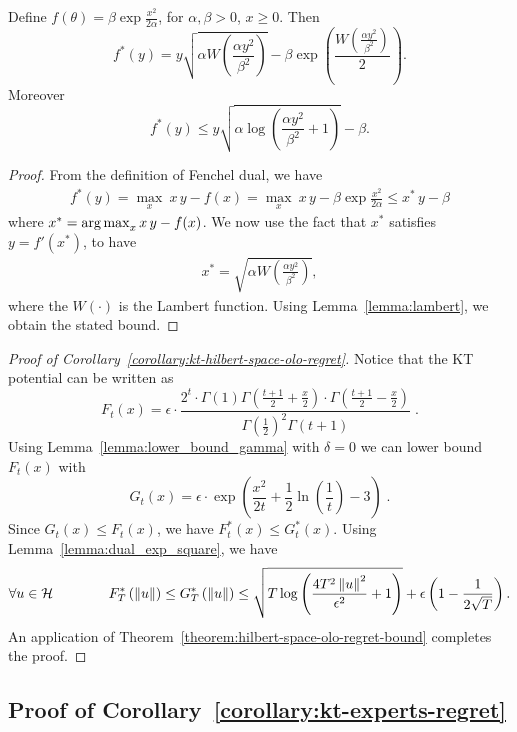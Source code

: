 \begin{lemma}
\label{lemma:dual_exp_square}
Define $f(\theta)= \beta \exp\frac{x^2}{2 \alpha}$, for $\alpha,\beta>0$, $x\geq0$. Then
\[
f^*(y)=y \sqrt{\alpha W\left(\frac{\alpha y^2}{\beta^2}\right)} - \beta \exp\left(\frac{W\left(\frac{\alpha y^2}{\beta^2}\right)}{2}\right).
\]
Moreover
\[
f^*(y) \leq y \sqrt{\alpha \log \left(\frac{\alpha y^2}{\beta^2} +1 \right)} - \beta.
\]
\end{lemma}
\begin{proof}
From the definition of Fenchel dual, we have
\begin{align*}
f^*(y)= \max_{x} \  x\, y - f(x) = \max_{x} \  x\, y - \beta \exp\frac{x^2}{2 \alpha} \leq x^*\,y -\beta
\end{align*}
where $x^*= \operatorname*{arg\,max}_{x} x\, y - f(x)$. We now use the fact that $x^*$ satisfies $y = f'(x^*)$, to have
\begin{align*}
x^*=\sqrt{\alpha W\left(\frac{\alpha y^2}{\beta^2}\right)},
\end{align*}
where the $W(\cdot)$ is the Lambert function.
Using Lemma~\ref{lemma:lambert}, we obtain the stated bound.
\end{proof}


\begin{proof}[Proof of Corollary~\ref{corollary:kt-hilbert-space-olo-regret}]
Notice that the KT potential can be written as
\[
F_t(x) = \epsilon \cdot \frac{2^t \cdot \Gamma(1) \Gamma \left(\frac{t+1}{2} + \frac{x}{2} \right) \cdot \Gamma \left(\frac{t+1}{2} - \frac{x}{2} \right)}{ \Gamma(\frac{1}{2})^2 \Gamma(t+1)} \; .
\]
Using Lemma~\ref{lemma:lower_bound_gamma} with $\delta = 0$ we can lower bound $F_t(x)$ with
\[
G_t(x) = \epsilon \cdot \exp\left(\frac{x^2}{2t} + \frac{1}{2} \ln \left(\frac{1}{t} \right) -3 \right) \; .
\]
Since $G_t(x) \le F_t(x)$, we have $F^*_t(x) \le G_t^*(x)$. Using Lemma~\ref{lemma:dual_exp_square}, we have
\[
\forall u \in \mathcal{H} \qquad \qquad
F^*_T\left(\left\|{u}\right\|\right)
\le G^*_T\left(\left\|{u}\right\|\right)
\le \sqrt{T \log \left(\frac{4 T^2 \left\|{u}\right\|^2}{\epsilon^2} +1 \right)}+\epsilon\left(1-\frac{1}{2\sqrt{T}}\right).
\]
An application of Theorem~\ref{theorem:hilbert-space-olo-regret-bound} completes the proof.
\end{proof}

\subsection{Proof of Corollary~\ref{corollary:kt-experts-regret}}

